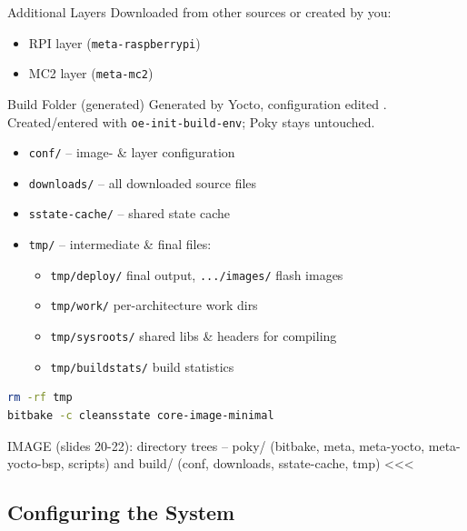 \begin{definition}{Additional Layers}
    Downloaded from other sources or created by you:
    \begin{itemize}
        \item RPI layer (\texttt{meta-raspberrypi})
        \item MC2 layer (\texttt{meta-mc2})
    \end{itemize}
\end{definition}

\multend

\begin{definition}{Build Folder (generated)}
    Generated by Yocto, configuration edited .
    Created/entered with \texttt{oe-init-build-env}; Poky stays untouched.
    \begin{itemize}
        \item \texttt{conf/} -- image- \& layer configuration
        \item \texttt{downloads/} -- all downloaded source files
        \item \texttt{sstate-cache/} -- shared state cache
        \item \texttt{tmp/} -- intermediate \& final files:
        \begin{itemize}
            \item \texttt{tmp/deploy/} final output, \texttt{.../images/} flash images
            \item \texttt{tmp/work/} per-architecture work dirs
            \item \texttt{tmp/sysroots/} shared libs \& headers for compiling
            \item \texttt{tmp/buildstats/} build statistics
        \end{itemize}
    \end{itemize}
\begin{lstlisting}[language=bash, style=basesmol, aboveskip=2pt, belowskip=2pt]
rm -rf tmp
bitbake -c cleansstate core-image-minimal
\end{lstlisting}
\end{definition}

IMAGE (slides 20-22): directory trees -- poky/ (bitbake, meta, meta-yocto, meta-yocto-bsp, scripts) and build/ (conf, downloads, sstate-cache, tmp) <<<

\subsection{Configuring the System}

